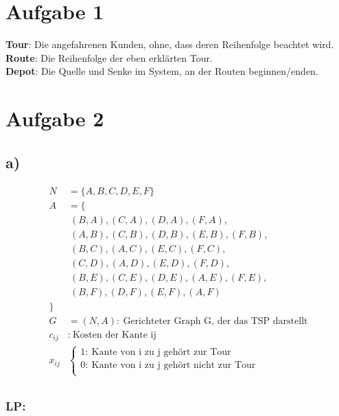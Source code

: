 \documentclass[a4paper,11pt]{article}
\begin{document}
\raggedright %
\setlength{\mathindent}{0cm} %

\section*{Aufgabe 1}

\textbf{Tour}: Die angefahrenen Kunden, ohne, dass deren Reihenfolge beachtet wird. \\
\textbf{Route}: Die Reihenfolge der eben erklärten Tour. \\
\textbf{Depot}: Die Quelle und Senke im System, an der Routen beginnen/enden. \\

\section*{Aufgabe 2}

\subsection*{a)}

\begin{align*}
    N &= \{A, B, C, D, E, F\} \\
    A &= \{ \\
      &~(B, A), (C, A), (D, A), (F, A), \\
      &~(A, B), (C, B), (D, B), (E, B), (F, B), \\
      &~(B, C), (A, C), (E, C), (F, C), \\
      &~(C, D), (A, D), (E, D), (F, D), \\
      &~(B, E), (C, E), (D, E), (A, E), (F, E), \\
      &~(B, F), (D, F), (E, F), (A, F) \\
        \} \\
    G &= (N, A): ~\text{Gerichteter Graph G, der das TSP darstellt} \\
    c_{ij} &: ~\text{Kosten der Kante ij} \\
    x_{ij} & \left\{\begin{array}{l}
        1: ~\text{Kante von i zu j gehört zur Tour} \\
        0: ~\text{Kante von i zu j gehört nicht zur Tour} \\
    \end{array}\right. \\
\end{align*}

\subsubsection*{LP: }
\end{document}
